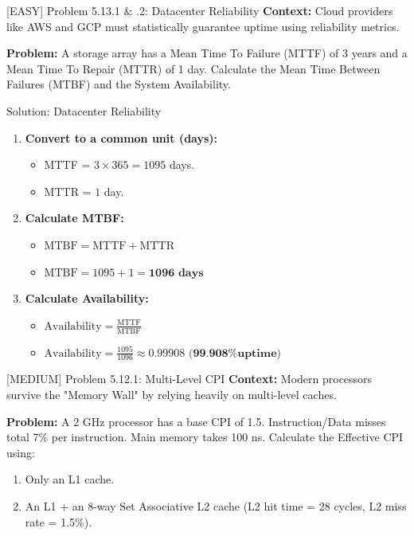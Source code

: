 \documentclass[aspectratio=169]{beamer}
\begin{document}
\begin{frame}{[EASY] Problem 5.13.1 \& .2: Datacenter Reliability}
\textbf{Context:} Cloud providers like AWS and GCP must statistically guarantee uptime using reliability metrics.
\vspace{0.5cm}

\textbf{Problem:}
A storage array has a Mean Time To Failure (MTTF) of 3 years and a Mean Time To Repair (MTTR) of 1 day. Calculate the Mean Time Between Failures (MTBF) and the System Availability.
\end{frame}

\begin{frame}{Solution: Datacenter Reliability}
\begin{enumerate}
    \item \textbf{Convert to a common unit (days):}
    \begin{itemize}
        \item MTTF = $3 \times 365 = 1095$ days.
        \item MTTR = $1$ day.
    \end{itemize}
    \item \textbf{Calculate MTBF:}
    \begin{itemize}
        \item $\text{MTBF} = \text{MTTF} + \text{MTTR}$
        \item $\text{MTBF} = 1095 + 1 = \mathbf{1096 \text{ days}}$
    \end{itemize}
    \item \textbf{Calculate Availability:}
    \begin{itemize}
        \item $\text{Availability} = \frac{\text{MTTF}}{\text{MTBF}}$
        \item $\text{Availability} = \frac{1095}{1096} \approx \mathbf{0.99908 \text{ (99.908\% uptime)}}$
    \end{itemize}
\end{enumerate}
\end{frame}

\begin{frame}{[MEDIUM] Problem 5.12.1: Multi-Level CPI}
\textbf{Context:} Modern processors survive the "Memory Wall" by relying heavily on multi-level caches.
\vspace{0.5cm}

\textbf{Problem:}
A 2 GHz processor has a base CPI of 1.5. Instruction/Data misses total 7\% per instruction. Main memory takes 100 ns. Calculate the Effective CPI using: 
\begin{enumerate}
    \item Only an L1 cache.
    \item An L1 + an 8-way Set Associative L2 cache (L2 hit time = 28 cycles, L2 miss rate = 1.5\%).
\end{enumerate}
\end{frame}
\end{document}
